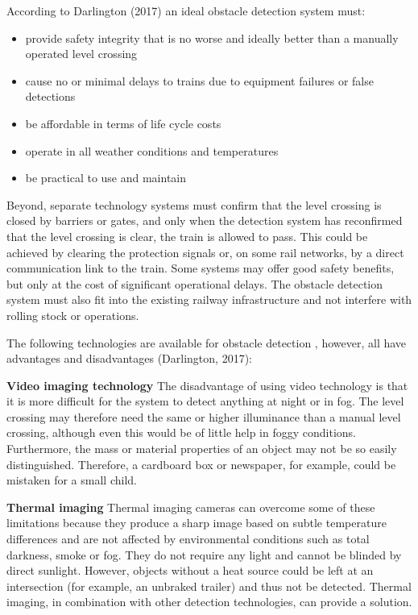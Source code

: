 \documentclass[
]{book}
\providecommand{\tightlist}{%
  \setlength{\itemsep}{0pt}\setlength{\parskip}{0pt}}
\begin{document}
According to Darlington (2017) an ideal obstacle detection system must:

\begin{itemize}
\tightlist
\item
  provide safety integrity that is no worse and ideally better than a manually operated level crossing
\item
  cause no or minimal delays to trains due to equipment failures or false detections
\item
  be affordable in terms of life cycle costs
\item
  operate in all weather conditions and temperatures
\item
  be practical to use and maintain
\end{itemize}

Beyond, separate technology systems must confirm that the level crossing is closed by barriers or gates, and only when the detection system has reconfirmed that the level crossing is clear, the train is allowed to pass. This could be achieved by clearing the protection signals or, on some rail networks, by a direct communication link to the train. Some systems may offer good safety benefits, but only at the cost of significant operational delays. The obstacle detection system must also fit into the existing railway infrastructure and not interfere with rolling stock or operations.

The following technologies are available for obstacle detection , however, all have advantages and disadvantages (Darlington, 2017):

\textbf{Video imaging technology}
The disadvantage of using video technology is that it is more difficult for the system to detect anything at night or in fog. The level crossing may therefore need the same or higher illuminance than a manual level crossing, although even this would be of little help in foggy conditions. Furthermore, the mass or material properties of an object may not be so easily distinguished. Therefore, a cardboard box or newspaper, for example, could be mistaken for a small child.

\textbf{Thermal imaging}
Thermal imaging cameras can overcome some of these limitations because they produce a sharp image based on subtle temperature differences and are not affected by environmental conditions such as total darkness, smoke or fog. They do not require any light and cannot be blinded by direct sunlight. However, objects without a heat source could be left at an intersection (for example, an unbraked trailer) and thus not be detected. Thermal imaging, in combination with other detection technologies, can provide a solution.
\end{document}
